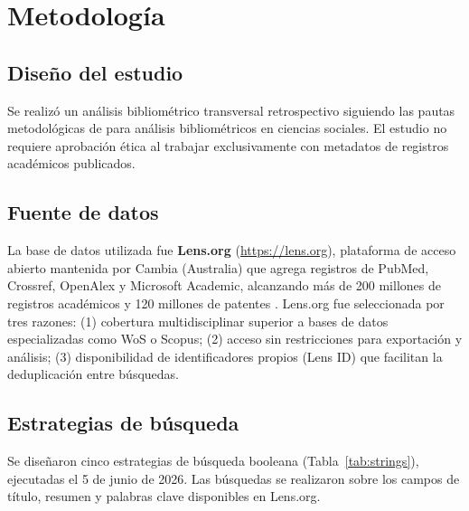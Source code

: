 \documentclass[12pt, a4paper]{article}
\begin{document}
\section{Metodología}
\label{sec:metodo}

\subsection{Diseño del estudio}

Se realizó un análisis bibliométrico transversal retrospectivo siguiendo las pautas
metodológicas de \textcite{donthu2021} para análisis bibliométricos en ciencias
sociales. El estudio no requiere aprobación ética al trabajar exclusivamente con
metadatos de registros académicos publicados.

\subsection{Fuente de datos}

La base de datos utilizada fue \textbf{Lens.org} (\url{https://lens.org}), plataforma
de acceso abierto mantenida por Cambia (Australia) que agrega registros de PubMed,
Crossref, OpenAlex y Microsoft Academic, alcanzando más de 200 millones de registros
académicos y 120 millones de patentes \parencite{lens2024}. Lens.org fue seleccionada
por tres razones: (1) cobertura multidisciplinar superior a bases de datos
especializadas como WoS o Scopus; (2) acceso sin restricciones para exportación y
análisis; (3) disponibilidad de identificadores propios (Lens ID) que facilitan la
deduplicación entre búsquedas.

\subsection{Estrategias de búsqueda}

Se diseñaron cinco estrategias de búsqueda booleana (Tabla~\ref{tab:strings}),
ejecutadas el 5 de junio de 2026. Las búsquedas se realizaron sobre los campos
de título, resumen y palabras clave disponibles en Lens.org.
\end{document}
